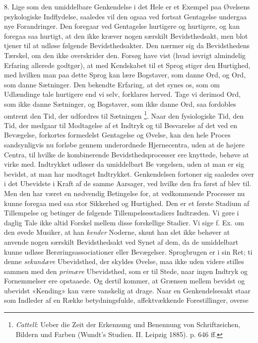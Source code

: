 \documentclass[12pt,a4paper,openany]{book}
\newcommand{\opage}[1]{\marginnote{\footnotesize\textit{[#1]}}}
\begin{document}
8. Lige som den umiddelbare Genkendelse i det Hele er et Exempel paa Øvelsens
psykologiske Indflydelse, saaledes vil den ogsaa ved fortsat Gentagelse
undergaa nye Forandringer. Den foregaar ved Gentagelse hurtigere og hurtigere,
og kan foregaa saa hurtigt, at den ikke kræver nogen særskilt Bevidsthedsakt,
men blot tjener til at udløse følgende Bevidsthedsakter. Den nærmer sig da
Bevidsthedens Tærskel, om den ikke overskrider den. Forsøg have vist (hvad
iøvrigt almindelig Erfaring allerede godtgør), at med Kendskabet til et Sprog
stiger den Hurtighed, med hvilken man paa dette Sprog kan lære Bogstaver, som
danne Ord, og Ord, som danne Sætninger. Den bekendte Erfaring, at det synes os,
som om Udlændinge tale hurtigere end vi selv, forklares herved. Tage vi derimod
Ord, som ikke danne Sætninger, og Bogstaver, som ikke danne Ord, saa fordobles
omtrent den Tid, der udfordres til Sætningen%
\footnote[2]{\emph{Cattell}: Ueber die Zeit der Erkennung und Benennung von
Schriftzeichen, Bildern und Farben (Wundt's Studien. II. Leipzig 1885). p. 646
ff.}. Naar den fysiologiske Tid, den Tid, der medgaar til Modtagelse af et
Indtryk og til Besvarelse af det ved en Bevægelse, forkortes formedelst
Gentagelse og Øvelse, kan den hele Proces sandsynligvis nu forløbe gennem
underordnede Hjernecentra, uden at de højere Centra, til hvilke de kombinerende
Bevidsthedsprocesser ere knyttede, behøve at virke med. Indtrykket udløser da
umiddelbart Be%
\setcounter{footnote}{0}%
\opage{17}vægelsen, uden at man er sig bevidst, at man har modtaget Indtrykket.
Genkendelsen fortoner sig saaledes over i det Ubevidste i Kraft af de samme
Aarsager, ved hvilke den fra først af blev til. Men den har været en nødvendig
Betingelse for, at vedkommende Processer nu kunne foregaa med saa stor
Sikkerhed og Hurtighed. Den er et første Stadium af Tillempelse og betinger de
følgende Tillempelsesstadiers Indtræden. Vi gøre i daglig Tale ikke altid
Forskel mellem disse forskellige Stadier. Vi sige f. Ex. om den øvede Musiker,
at han \emph{kender} Noderne, skønt han slet ikke behøver at anvende nogen
særskilt Bevidsthedsakt ved Synet af dem, da de umiddelbart kunne udløse
Berøringsassociationer eller Bevægelser. Sprogbrugen er i sin Ret; ti denne
\emph{sekundære} Ubevidsthed, der skyldes Øvelse, maa ikke uden videre stilles
sammen med den \emph{primære} Ubevidsthed, som er til Stede, naar ingen Indtryk
og Fornemmelser ere opstaaede. Og dertil kommer, at Grænsen mellem bevidst og
ubevidst «Kending» kan være vanskelig at drage. Naar en Genkendelsesakt staar
som Indleder af en Række betydningsfulde, affektvækkende Forestillinger, overse
\end{document}
